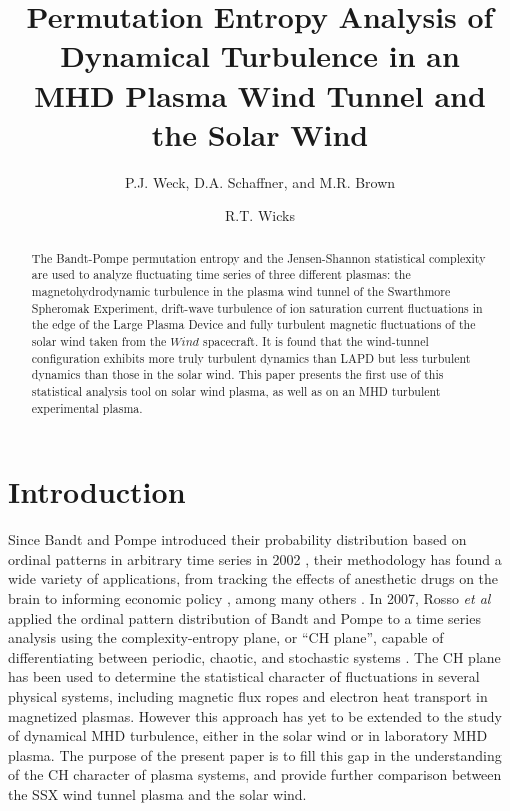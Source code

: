 \documentclass[aps,pre,twocolumn,secnumarabic,nobalancelastpage,amsmath,amssymb,
nofootinbib]{revtex4-1}
\begin{document}
\title{Permutation Entropy Analysis of Dynamical Turbulence in an  \\MHD Plasma Wind Tunnel and the Solar Wind}
\author{P.J. Weck, D.A. Schaffner, and M.R. Brown}
\author{R.T. Wicks}
\begin{abstract}
The Bandt-Pompe permutation entropy and the Jensen-Shannon statistical complexity are used to analyze fluctuating time series of three different plasmas: the magnetohydrodynamic turbulence in the plasma wind tunnel of the Swarthmore Spheromak Experiment, drift-wave turbulence of ion saturation current fluctuations in the edge of the Large Plasma Device and fully turbulent magnetic fluctuations of the solar wind taken from the $\textit{Wind} $ spacecraft. It is found that the wind-tunnel configuration exhibits more truly turbulent dynamics than LAPD but less turbulent dynamics than those in the solar wind. This paper presents the first use of this statistical analysis tool on solar wind plasma, as well as on an MHD turbulent experimental plasma.
\end{abstract}
\maketitle

\section{Introduction}
Since Bandt and Pompe introduced their probability distribution based on ordinal patterns in arbitrary time series in 2002 \cite{bandt2002}, their methodology has found a wide variety of applications, from tracking the effects of anesthetic drugs on the brain \cite{li2010,jordan2008,olofsen2008} to informing economic policy \cite{bariviera2013,zunino2010,zunino2011}, among many others \cite{kowalski2007,soriano2011,saco2010,suyal2012,sun2010}. In 2007, Rosso \textit{et al} applied the ordinal pattern distribution of Bandt and Pompe to a time series analysis using the complexity-entropy plane, or “CH plane”, capable of differentiating between periodic, chaotic, and stochastic systems \cite{rosso2007}. The CH plane has been used to determine the statistical character of fluctuations in several physical systems, including magnetic flux ropes \cite{gekelman2014} and electron heat transport \cite{maggs2013} in magnetized plasmas. However this approach has yet to be extended to the study of dynamical MHD turbulence, either in the solar wind or in laboratory MHD plasma. The purpose of the present paper is to fill this gap in the understanding of the CH character of plasma systems, and provide further comparison between the SSX wind tunnel plasma and the solar wind.
\end{document}
